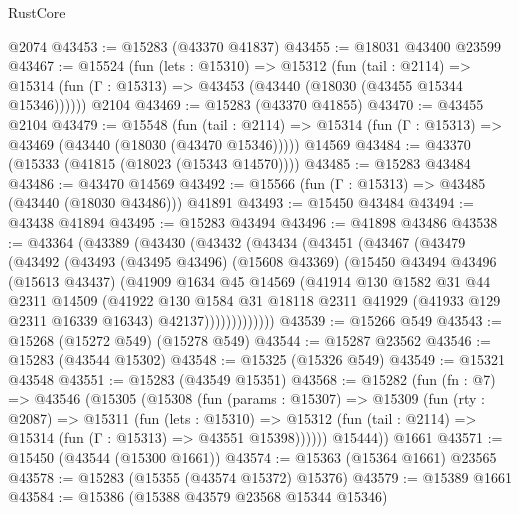 \begin{lexlean}{RustCore}
\begin{coremodule}
    @2074
@43453 := @15283 (@43370 @41837)
@43455 := @18031 @43400 @23599
@43467 := @15524
    (fun (lets : @15310) =>
    @15312
      (fun (tail : @2114) =>
      @15314 (fun (Γ : @15313) => @43453 (@43440 (@18030 (@43455 @15344 @15346))))))
    @2104
@43469 := @15283 (@43370 @41855)
@43470 := @43455 @2104
@43479 := @15548
    (fun (tail : @2114) => @15314 (fun (Γ : @15313) => @43469 (@43440 (@18030 (@43470 @15346)))))
    @14569
@43484 := @43370 (@15333 (@41815 (@18023 (@15343 @14570))))
@43485 := @15283 @43484
@43486 := @43470 @14569
@43492 := @15566 (fun (Γ : @15313) => @43485 (@43440 (@18030 @43486))) @41891
@43493 := @15450 @43484
@43494 := @43438 @41894
@43495 := @15283 @43494
@43496 := @41898 @43486
@43538 := @43364
    (@43389
      (@43430
        (@43432
          (@43434
            (@43451
              (@43467
                (@43479
                  (@43492
                    (@43493
                      (@43495 @43496)
                      (@15608 @43369)
                      (@15450
                        @43494
                        @43496
                        (@15613 @43437)
                        (@41909
                          @1634
                          @45
                          @14569
                          (@41914
                            @130
                            @1582
                            @31
                            @44
                            @2311
                            @14509
                            (@41922
                              @130
                              @1584
                              @31
                              @18118
                              @2311
                              @41929
                              (@41933 @129 @2311 @16339 @16343)
                              @42137)))))))))))))
@43539 := @15266 @549
@43543 := @15268 (@15272 @549) (@15278 @549)
@43544 := @15287 @23562
@43546 := @15283 (@43544 @15302)
@43548 := @15325 (@15326 @549)
@43549 := @15321 @43548
@43551 := @15283 (@43549 @15351)
@43568 := @15282
    (fun (fn : @7) =>
    @43546
      (@15305
        (@15308
          (fun (params : @15307) =>
          @15309
            (fun (rty : @2087) =>
            @15311
              (fun (lets : @15310) =>
              @15312 (fun (tail : @2114) => @15314 (fun (Γ : @15313) => @43551 @15398))))))
        @15444))
    @1661
@43571 := @15450 (@43544 (@15300 @1661))
@43574 := @15363 (@15364 @1661) @23565
@43578 := @15283 (@15355 (@43574 @15372) @15376)
@43579 := @15389 @1661
@43584 := @15386 (@15388 @43579 @23568 @15344 @15346)

\end{coremodule}
\end{lexlean}
